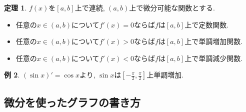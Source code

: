 \documentclass[dvipdfmx,a4paper,11pt]{article}
\theoremstyle{definition}
\newtheorem{thm}{定理}
\newtheorem{exa}[thm]{例}
\begin{document}
\begin{tcolorbox}[
    colback = white,
    colframe = green!35!black,
    fonttitle = \bfseries,
    breakable = true]
    \begin{thm}
    $f(x)$を$[a,b]$上で連続, $(a,b)$上で微分可能な関数とする.
\begin{itemize}
\setlength{\parskip}{0cm} 
  \setlength{\itemsep}{0cm}
\item 任意の$x \in (a,b)$について$f'(x)=0$ならば$f$は$[a,b]$上で定数関数.
\item 任意の$x \in (a,b)$について$f'(x)>0$ならば$f$は$[a,b]$上で単調増加関数.
\item 任意の$x \in (a,b)$について$f'(x)<0$ならば$f$は$[a,b]$上で単調減少関数.
\end{itemize}

    \end{thm}
\end{tcolorbox}

\begin{exa}
$(\sin x)' = \cos x$より, $\sin x$は$[-\frac{\pi}{2}, \frac{\pi}{2}]$上単調増加.
\end{exa}





\subsection{微分を使ったグラフの書き方}
\end{document}
